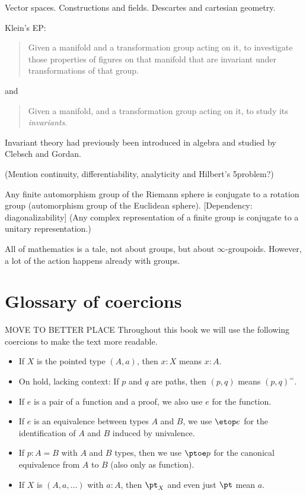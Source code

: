 Vector spaces. Constructions and fields. Descartes and cartesian geometry.

Klein's EP:
\begin{quote}
  Given a manifold and a transformation group acting on it,
  to investigate those properties of figures on that manifold
  that are invariant under transformations of that group.
\end{quote}
and
\begin{quote}
  Given a manifold, and a transformation group acting on it,
  to study its \emph{invariants}.
\end{quote}
Invariant theory had previously been introduced in algebra
and studied by Clebsch and Gordan.

(Mention continuity, differentiability, analyticity and Hilbert's 5\th problem?)

Any finite automorphism group of the Riemann sphere is conjugate to a
rotation group (automorphism group of the Euclidean sphere).
[Dependency: diagonalizability] (Any complex representation of a
finite group is conjugate to a unitary representation.)


All of mathematics is a tale, not about groups,
but about $\infty$-groupoids.
However, a lot of the action happens already with groups.

\newpage

\section*{Glossary of coercions}

MOVE TO BETTER PLACE
Throughout this book we will use the following coercions to make the text more readable.
\begin{itemize}[noitemsep]
\item If $X$ is the pointed type $(A,a)$, then $x:X$ means $x:A$.
\item On hold, lacking context: If $p$ and $q$ are paths, then $(p,q)$ means $(p,q)^=$.
\item If $e$ is a pair of a function and a proof, we also use $e$ for the function.
\item If $e$ is an equivalence between types $A$ and $B$, we use $\etop e$ for the
identification of $A$ and $B$ induced by univalence.
\item If $p: A= B$ with $A$ and $B$ types, then we use $\ptoe p$ for the canonical
equivalence from $A$ to $B$ (also only as function).
\item If $X$ is $(A,a,\ldots)$ with $a:A$, then $\pt_X$ and even just $\pt$ mean $a$.
\end{itemize}

